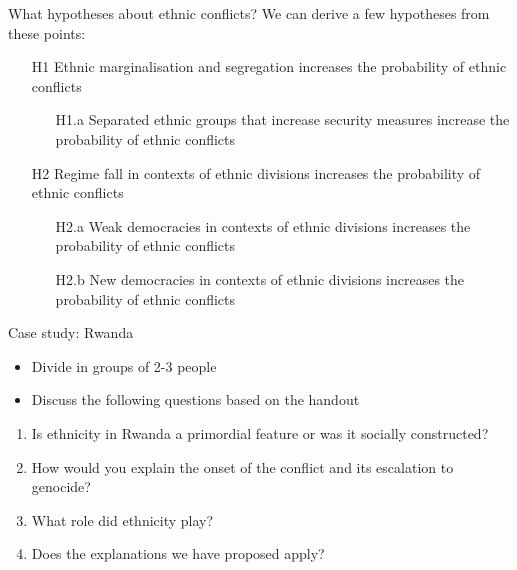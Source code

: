 \documentclass[xcolor=table]{beamer}
\begin{document}
\begin{frame}{What hypotheses about ethnic conflicts?}
We can derive a few hypotheses from these points: \pause
\begin{enumerate}
\item[H1] Ethnic marginalisation and segregation increases the probability of ethnic conflicts \pause
	\begin{itemize}
	\item[H1.a] Separated ethnic groups that increase security measures increase the probability of ethnic conflicts \pause
	\end{itemize}
\item[H2] Regime fall in contexts of ethnic divisions increases the probability of ethnic conflicts \pause
	\begin{enumerate}
	\item[H2.a] Weak democracies in contexts of ethnic divisions increases the probability of ethnic conflicts \pause
	\item[H2.b] New democracies in contexts of ethnic divisions increases the probability of ethnic conflicts
	\end{enumerate}
\end{enumerate}
\end{frame}

\begin{frame}{Case study: Rwanda}
\begin{itemize}
\item Divide in groups of 2-3 people
\item Discuss the following questions based on the handout
\end{itemize} \pause

\begin{enumerate}
\item Is ethnicity in Rwanda a primordial feature or was it socially constructed? \pause
\item How would you explain the onset of the conflict and its escalation to genocide? \pause
\item What role did ethnicity play? \pause
\item Does the explanations we have proposed apply?
\end{enumerate}
\end{frame}
\end{document}
